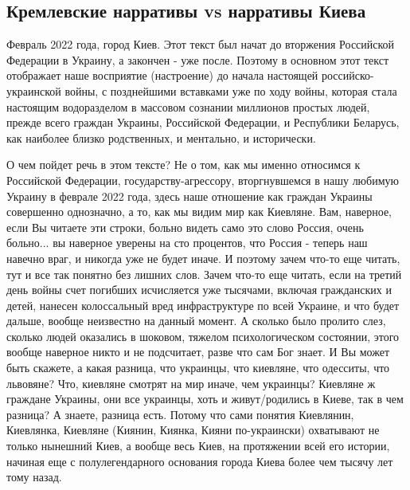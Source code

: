  
 
 
 
 

\subsection{Кремлевские нарративы vs нарративы Киева}

Февраль 2022 года, город Киев. Этот текст был начат до вторжения Российской
Федерации в Украину, а закончен - уже после. Поэтому в основном этот текст
отображает наше восприятие (настроение) до начала настоящей
российско-украинской войны, с позднейшими вставками уже по ходу войны, которая
стала настоящим водоразделом в массовом сознании миллионов простых людей,
прежде всего граждан Украины, Российской Федерации, и Республики Беларусь, как
наиболее близко родственных, и ментально, и исторически.

О чем пойдет речь в этом тексте? Не о том, как мы именно относимся к Российской
Федерации, государству-агрессору, вторгнувшемся в нашу любимую Украину в феврале 2022 года,
здесь наше отношение как граждан Украины совершенно однозначно, а то, как мы
видим мир как Киевляне. Вам, наверное, если Вы читаете эти строки, больно
видеть само это слово Россия, очень больно... вы наверное уверены на сто
процентов, что Россия - теперь наш навечно враг, и никогда уже не будет иначе.
И поэтому зачем что-то еще читать, тут и все так понятно без лишних слов. Зачем
что-то еще читать, если на третий день войны счет погибших исчисляется уже
тысячами, включая гражданских и детей, нанесен колоссальный вред инфраструктуре
по всей Украине, и что будет дальше, вообще неизвестно на данный момент.  А
сколько было пролито слез, сколько людей оказались в шоковом, тяжелом
психологическом состоянии, этого вообще наверное никто и не подсчитает, разве
что сам Бог знает. И Вы может быть скажете, а какая разница, что украинцы, что
киевляне, что одесситы, что львовяне? Что, киевляне смотрят на мир иначе, чем
украинцы?  Киевляне ж граждане Украины, они все украинцы, хоть и живут/родились в Киеве,
так в чем разница?  А знаете, разница есть. Потому что сами понятия Киевлянин,
Киевлянка, Киевляне (Киянин, Киянка, Кияни по-украински) охватывают не только
нынешний Киев, а вообще весь Киев, на протяжении всей его истории, начиная еще
с полулегендарного основания города Киева более чем тысячу лет тому назад.

